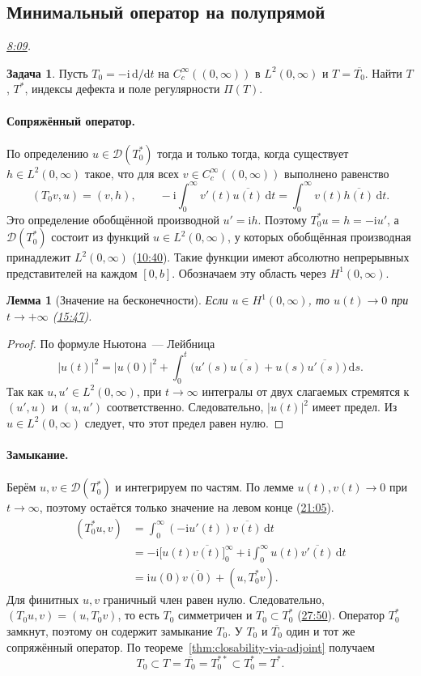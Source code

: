 \documentclass[11pt,a4paper]{article}
\theoremstyle{plain}
\newtheorem{lemma}[theorem]{Лемма}
\theoremstyle{definition}
\newtheorem{exercise}[theorem]{Задача}
\newcommand{\Dom}{\mathcal D}
\newcommand{\dd}{\,\mathrm d}
\newcommand{\ii}{\mathrm i}
\newcommand{\abs}[1]{\lvert#1\rvert}
\newcommand{\sch}[1]{C_c^\infty(#1)}
\newcommand{\at}[3]{\href{https://www.youtube.com/watch?v=#1&t=#2s}{#3}}
\newcommand{\topic}[2]{\Needspace{5\baselineskip}\subsection*{#1}\noindent\emph{#2.}\par\nobreak\smallskip}
\begin{document}
\topic{Минимальный оператор на полупрямой}{\at{2s-Uo0FKoAE}{489}{8:09}}
\begin{exercise}
Пусть $T_0=-\ii\,\mathrm d/\mathrm dt$ на $\sch{(0,\infty)}$
в $L^2(0,\infty)$ и $T=\overline{T_0}$. Найти $T$, $T^*$,
индексы дефекта и поле регулярности $\Pi(T)$.
\end{exercise}
\paragraph*{Сопряжённый оператор.}
По определению $u\in\Dom(T_0^*)$ тогда и только тогда, когда
существует $h\in L^2(0,\infty)$ такое, что для всех
$v\in\sch{(0,\infty)}$ выполнено равенство
\[
 (T_0v,u)=(v,h),\qquad
 -\ii\int_0^\infty v'(t)\overline{u(t)}\dd t
 =\int_0^\infty v(t)\overline{h(t)}\dd t.
\]
Это определение обобщённой производной $u'=\ii h$. Поэтому
$T_0^*u=h=-\ii u'$, а $\Dom(T_0^*)$ состоит из функций $u\in L^2(0,\infty)$,
у которых обобщённая производная принадлежит $L^2(0,\infty)$
(\at{2s-Uo0FKoAE}{640}{10:40}). Такие функции имеют абсолютно
непрерывных представителей на каждом $[0,b]$. Обозначаем
эту область через $H^1(0,\infty)$.

\begin{lemma}[Значение на бесконечности]
Если $u\in H^1(0,\infty)$, то $u(t)\to0$ при $t\to+\infty$
(\at{2s-Uo0FKoAE}{947}{15:47}).
\end{lemma}
\begin{proof}
По формуле Ньютона~--- Лейбница
\[
 \abs{u(t)}^2=\abs{u(0)}^2+
 \int_0^t\bigl(u'(s)\overline{u(s)}+u(s)\overline{u'(s)}\bigr)\dd s.
\]
Так как $u,u'\in L^2(0,\infty)$, при $t\to\infty$ интегралы
от двух слагаемых стремятся к $(u',u)$ и $(u,u')$ соответственно.
Следовательно, $\abs{u(t)}^2$ имеет предел. Из $u\in L^2(0,\infty)$
следует, что этот предел равен нулю.
\end{proof}

\paragraph*{Замыкание.}
Берём $u,v\in\Dom(T_0^*)$ и интегрируем по частям. По лемме
$u(t),v(t)\to0$ при $t\to\infty$, поэтому остаётся только
значение на левом конце (\at{2s-Uo0FKoAE}{1265}{21:05}).
\[
 \begin{aligned}
 (T_0^*u,v)&=\int_0^\infty(-\ii u'(t))\overline{v(t)}\dd t\\
 &=-\ii\bigl[u(t)\overline{v(t)}\bigr]_0^\infty
   +\ii\int_0^\infty u(t)\overline{v'(t)}\dd t\\
 &=\ii u(0)\overline{v(0)}+(u,T_0^*v).
 \end{aligned}
\]
Для финитных $u,v$ граничный член равен нулю. Следовательно,
$(T_0u,v)=(u,T_0v)$, то есть $T_0$ симметричен и $T_0\subset T_0^*$
(\at{2s-Uo0FKoAE}{1670}{27:50}). Оператор $T_0^*$ замкнут, поэтому
он содержит замыкание $T_0$. У $T_0$ и $\overline{T_0}$ один и тот же
сопряжённый оператор. По теореме~\ref{thm:closability-via-adjoint}
получаем
\[
 T_0\subset T=\overline{T_0}=T_0^{**}\subset T_0^*=T^*.
\]
\end{document}
